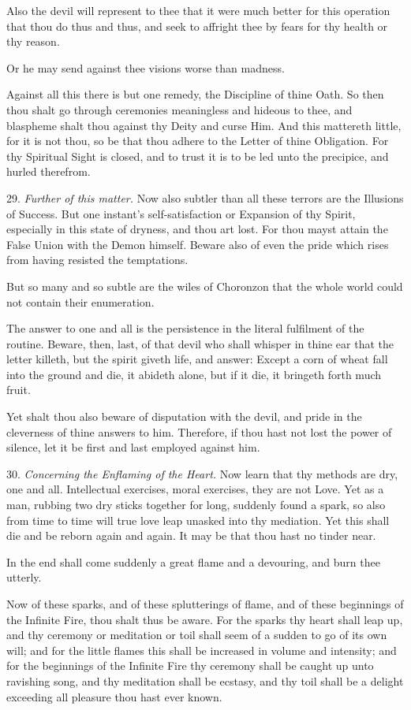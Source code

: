 Also the devil will represent to thee that it were much better for this operation that thou do thus and thus, and seek to affright thee by fears for thy health or thy reason.

Or he may send against thee visions worse than madness.

Against all this there is but one remedy, the Discipline of thine Oath. So then thou shalt go through ceremonies meaningless and hideous to thee, and blaspheme shalt thou against thy Deity and curse Him. And this mattereth little, for it is not thou, so be that thou adhere to the Letter of thine Obligation. For thy Spiritual Sight is closed, and to trust it is to be led unto the precipice, and hurled therefrom.

29. \textit{Further of this matter.} Now also subtler than all these terrors are the Illusions of Success. But one instant's self-satisfaction or Expansion of thy Spirit, especially in this state of dryness, and thou art lost. For thou mayst attain the False Union with the Demon himself. Beware also of even the pride which rises from having resisted the temptations.

But so many and so subtle are the wiles of Choronzon that the whole world could not contain their enumeration.

The answer to one and all is the persistence in the literal fulfilment of the routine. Beware, then, last, of that devil who shall whisper in thine ear that the letter killeth, but the spirit giveth life, and answer: Except a corn of wheat fall into the ground and die, it abideth alone, but if it die, it bringeth forth much fruit.

Yet shalt thou also beware of disputation with the devil, and pride in the cleverness of thine answers to him. Therefore, if thou hast not lost the power of silence, let it be first and last employed against him.

30. \textit{Concerning the Enflaming of the Heart.} Now learn that thy methods are dry, one and all. Intellectual exercises, moral exercises, they are not Love. Yet as a man, rubbing two dry sticks together for long, suddenly found a spark, so also from time to time will true love leap unasked into thy mediation. Yet this shall die and be reborn again and again. It may be that thou hast no tinder near.

In the end shall come suddenly a great flame and a devouring, and burn thee utterly.

Now of these sparks, and of these splutterings of flame, and of these beginnings of the Infinite Fire, thou shalt thus be aware. For the sparks thy heart shall leap up, and thy ceremony or meditation or toil shall seem of a sudden to go of its own will; and for the little flames this shall be increased in volume and intensity; and for the beginnings of the Infinite Fire thy ceremony shall be caught up unto ravishing song, and thy meditation shall be ecstasy, and thy toil shall be a delight exceeding all pleasure thou hast ever known.

